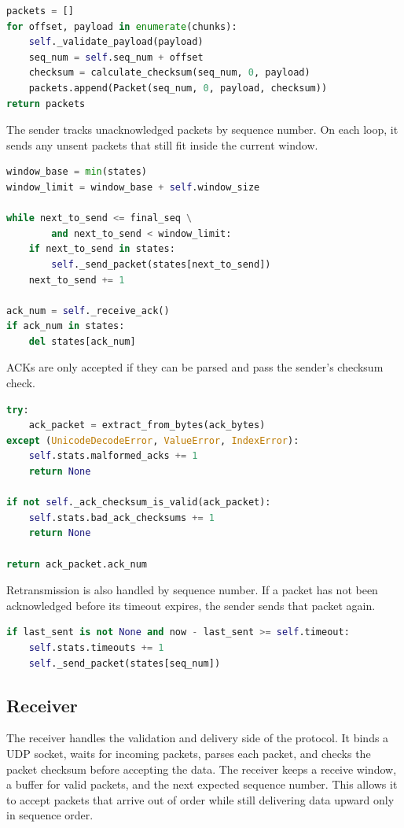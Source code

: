 \documentclass[conference]{IEEEtran}
\begin{document}
\begin{lstlisting}[language=Python]
packets = []
for offset, payload in enumerate(chunks):
    self._validate_payload(payload)
    seq_num = self.seq_num + offset
    checksum = calculate_checksum(seq_num, 0, payload)
    packets.append(Packet(seq_num, 0, payload, checksum))
return packets
\end{lstlisting}

The sender tracks unacknowledged packets by sequence number. On each loop, it
sends any unsent packets that still fit inside the current window.

\begin{lstlisting}[language=Python]
window_base = min(states)
window_limit = window_base + self.window_size

while next_to_send <= final_seq \
        and next_to_send < window_limit:
    if next_to_send in states:
        self._send_packet(states[next_to_send])
    next_to_send += 1

ack_num = self._receive_ack()
if ack_num in states:
    del states[ack_num]
\end{lstlisting}

ACKs are only accepted if they can be parsed and pass the sender's checksum
check.

\begin{lstlisting}[language=Python]
try:
    ack_packet = extract_from_bytes(ack_bytes)
except (UnicodeDecodeError, ValueError, IndexError):
    self.stats.malformed_acks += 1
    return None

if not self._ack_checksum_is_valid(ack_packet):
    self.stats.bad_ack_checksums += 1
    return None

return ack_packet.ack_num
\end{lstlisting}

Retransmission is also handled by sequence number. If a packet has not been
acknowledged before its timeout expires, the sender sends that packet again.

\begin{lstlisting}[language=Python]
if last_sent is not None and now - last_sent >= self.timeout:
    self.stats.timeouts += 1
    self._send_packet(states[seq_num])
\end{lstlisting}

\subsection{Receiver}
The receiver handles the validation and delivery side of the protocol. It binds
a UDP socket, waits for incoming packets, parses each packet, and checks the
packet checksum before accepting the data. The receiver keeps a receive window,
a buffer for valid packets, and the next expected sequence number. This allows
it to accept packets that arrive out of order while still delivering data upward
only in sequence order.
\end{document}
